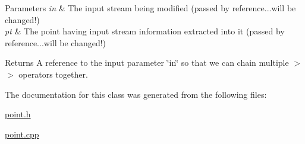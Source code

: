 \begin{DoxyParams}{Parameters}
{\em in} & The input stream being modified (passed by reference...will be changed!) \\
\hline
{\em pt} & The point having input stream information extracted into it (passed by reference...will be changed!) \\
\hline
\end{DoxyParams}
\begin{DoxyReturn}{Returns}
A reference to the input parameter \char`\"{}in\char`\"{} so that we can chain multiple $>$$>$ operators together. 
\end{DoxyReturn}


The documentation for this class was generated from the following files\+:\begin{DoxyCompactItemize}
\item 
\hyperlink{point_8h}{point.\+h}\item 
\hyperlink{point_8cpp}{point.\+cpp}\end{DoxyCompactItemize}

